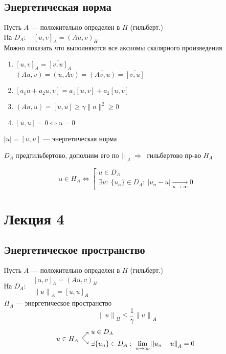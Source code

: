 \documentclass[12pt, a4paper]{article}
\begin{document}
\newpage

\subsection{Энергетическая норма}
Пусть $A$ --- положительно определен в $H$ (гильберт.) \\
На $D_A: \quad {[u, v]}_A = {(A u, v)}_H$ \\
Можно показать что выполняются все аксиомы скалярного произведения

\begin{enumerate}
	\item $ {[u, v]}_A = \overline{[v, u]}_A $ \\
		  $ (Au, v) = (u, Av) = \overline{(Av, u)} = \overline{[v, u]} $
	\item $ [a_1 u + a_2 u, v] = a_1[u, v] + a_2[u, v]$
	\item $ (Au, u) = [u, u] \geq \gamma \|u\|^2 \geq 0 $
	\item $ [u, u] = 0 \Leftrightarrow u = 0 $
\end{enumerate}

$ |u| = [u, u] $ --- энергетическая норма

$ D_A $ предгильбертово, дополним его по $ {|\boldsymbol{\cdot}|}_A \ \Rightarrow \ $ гильбертово пр-во $ H_A $

\[ u \in H_A \Leftrightarrow \left[ \begin{array}{l}
	u \in D_A \\
	\exists u : \ \{ u_n \} \in D_A: \ | u_n - u | \underset{n \rightarrow \infty}{\rightarrow} 0
\end{array} \right. \]

\newpage

\section{Лекция 4}

\subsection{Энергетическое пространство}

Пусть $A$ --- положительно определен в $H$ (гильберт.) \\
На $D_A: \enspace \begin{array}{l}
	{[u, v]}_A = {(A u, v)}_H \\
	{\|u\|}_A = {[u,u]}_A
\end{array} $ \\
$ H_A $ --- энергетическое пространство
\[ {\|u\|}_H \leq \frac{1}{\gamma   } {\|u\|}_A \label{4.0} \tag{4.0} \]
\[ u \in H_A \begin{array}{l@{\ }l}
	\raisebox{-1ex}{$\nearrow$} & u \in D_A \\
	\raisebox{1ex}{$\searrow$} & \exists \{ u_n \} \in D_A: \ \lim\limits_{n \rightarrow \infty} {\|u_n - u\|}_A = 0
\end{array} \]
\end{document}
